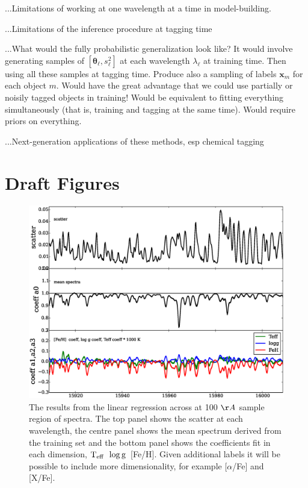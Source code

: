 \documentclass[12pt, preprint]{aastex}
\newcommand{\set}[1]{\bm{#1}}
\newcommand{\teff}{\mbox{$\rm T_{eff}$}}
\newcommand{\logg}{\mbox{$\rm \log g$}}
\begin{document}
...Limitations of working at one wavelength at a time in model-building.

...Limitations of the inference procedure at tagging time

...What would the fully probabilistic generalization look like?
It would involve generating samples of $[\set{\theta}_\ell, s_\ell^2]$ at each wavelength $\lambda_\ell$ at training time.
Then using all these samples at tagging time.
Produce also a sampling of labels $\set{x}_m$ for each object $m$.
Would have the great advantage that we could use partially or noisily tagged objects in training!
Would be equivalent to fitting everything simultaneously (that is, training and tagging at the same time).
Would require priors on everything.

...Next-generation applications of these methods, esp chemical tagging

\section{Draft Figures}



\begin{figure}[h!]
  \includegraphics[width=\hsize]{./plots/R1_example.eps}
\caption{The results from the linear regression across at 100 $\AA$ sample region of spectra. The top panel shows the scatter at each wavelength, the centre panel shows the mean spectrum derived from the training set and the bottom panel shows the coefficients fit in each dimension, \teff\, \logg\, [Fe/H]. Given additional labels it will be possible to include more dimensionality, for example [$\alpha$/Fe] and [X/Fe].}
\label{fig:fits}
\end{figure}
\end{document}
